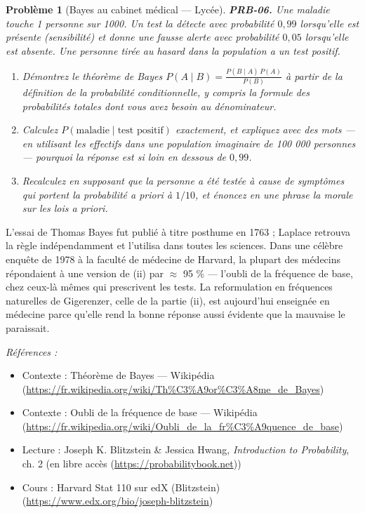 \documentclass[11pt]{article}
\newtheorem{problem}{Problème}
\newenvironment{refs}{\par\small\noindent\emph{Références :}\begin{itemize}\setlength\itemsep{0pt}}{\end{itemize}\normalsize}
\begin{document}
\bigskip

\begin{problem}[{Bayes au cabinet médical --- Lycée}]
\textbf{PRB-06.} Une maladie touche 1 personne sur 1000. Un test la
détecte avec probabilité $ 0{,}99 $ lorsqu'elle est présente (sensibilité) et donne une fausse
alerte avec probabilité $ 0{,}05 $ lorsqu'elle est absente. Une personne tirée au hasard dans la
population a un test positif.
\begin{enumerate}
\item[(i)] Démontrez le théorème de Bayes
$ P(A\mid B) = \frac{P(B\mid A)\,P(A)}{P(B)} $ à partir de la définition de la probabilité
conditionnelle, y compris la formule des probabilités totales dont vous avez besoin au
dénominateur.
\item[(ii)] Calculez $ P(\text{maladie} \mid \text{test positif}) $ exactement, et expliquez avec des
mots --- en utilisant les effectifs dans une population imaginaire de 100 000 personnes ---
pourquoi la réponse est si loin en dessous de $ 0{,}99 $.
\item[(iii)] Recalculez en supposant que la personne a été testée à cause de symptômes qui portent la
probabilité a priori à $ 1/10 $, et énoncez en une phrase la morale sur les lois a priori.
\end{enumerate}

\end{problem}

\noindent L'essai de Thomas Bayes fut publié à titre posthume en 1763 ; Laplace retrouva
la règle indépendamment et l'utilisa dans toutes les sciences. Dans une célèbre enquête de 1978 à
la faculté de médecine de Harvard, la plupart des médecins répondaient à une version de (ii) par
$\approx$ 95 \% --- l'oubli de la fréquence de base, chez ceux-là mêmes qui prescrivent les tests. La
reformulation en \og{} fréquences naturelles \fg{} de Gigerenzer, celle de la partie (ii), est aujourd'hui
enseignée en médecine parce qu'elle rend la bonne réponse aussi évidente que la mauvaise le
paraissait.

\begin{refs}
\item Contexte : Théorème de Bayes --- Wikipédia (\url{https://fr.wikipedia.org/wiki/Th%C3%A9or%C3%A8me_de_Bayes})
\item Contexte : Oubli de la fréquence de base --- Wikipédia (\url{https://fr.wikipedia.org/wiki/Oubli_de_la_fr%C3%A9quence_de_base})
\item Lecture : Joseph K. Blitzstein \& Jessica Hwang, \textit{Introduction to Probability}, ch. 2 (en libre accès (\url{https://probabilitybook.net}))
\item Cours : Harvard Stat 110 sur edX (Blitzstein) (\url{https://www.edx.org/bio/joseph-blitzstein})
\end{refs}
\end{document}
